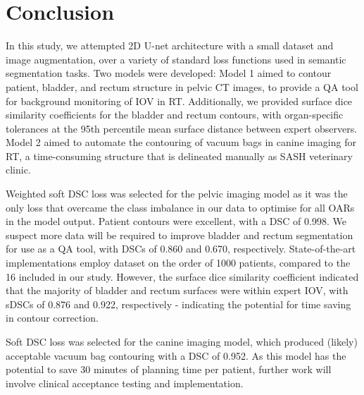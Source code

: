 \chapter{Conclusion}
\label{ch:conclusion}

In this study, we attempted 2D U-net architecture with a small dataset and image augmentation, over a variety of standard loss functions used in semantic segmentation tasks. Two models were developed: Model 1 aimed to contour patient, bladder, and rectum structure in pelvic CT images, to provide a QA tool for background monitoring of IOV in RT. Additionally, we provided surface dice similarity coefficients for the bladder and rectum contours, with organ-specific tolerances at the 95th percentile mean surface distance between expert observers. Model 2 aimed to automate the contouring of vacuum bags in canine imaging for RT, a time-consuming structure that is delineated manually as SASH veterinary clinic.

Weighted soft DSC loss was selected for the pelvic imaging model as it was the only loss that overcame the class imbalance in our data to optimise for all OARs in the model output. Patient contours were excellent, with a DSC of 0.998. We suspect more data will be required to improve bladder and rectum segmentation for use as a QA tool, with DSCs of 0.860 and 0.670, respectively. State-of-the-art implementations employ dataset on the order of 1000 patients, compared to the 16 included in our study. However, the surface dice similarity coefficient indicated that the majority of bladder and rectum surfaces were within expert IOV, with sDSCs of 0.876 and 0.922, respectively - indicating the potential for time saving in contour correction.

Soft DSC loss was selected for the canine imaging model, which produced (likely) acceptable vacuum bag contouring with a DSC of 0.952. As this model has the potential to save 30 minutes of planning time per patient, further work will involve clinical acceptance testing and implementation.



